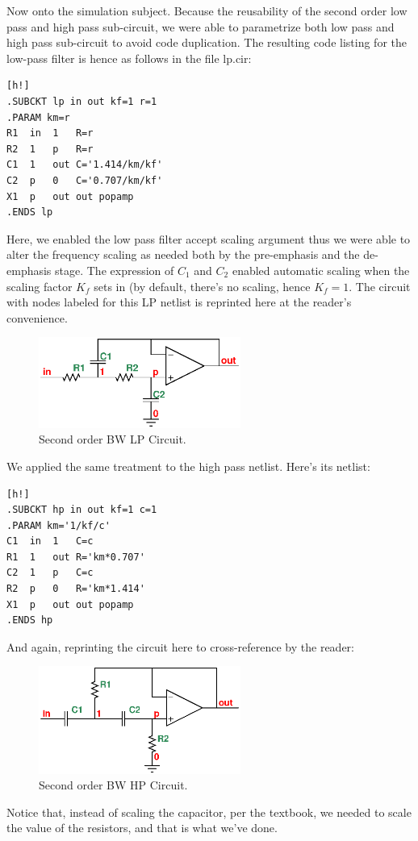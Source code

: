 \documentclass[report]{IEEEtran}
\begin{document}
		Now onto the simulation subject. Because the reusability of the second order low pass and high pass sub-circuit, we were able to parametrize both low pass and high pass sub-circuit to avoid code duplication. The resulting code listing for the low-pass filter is hence as follows in the file lp.cir:
		\begin{center}
		\begin{lstlisting}[caption=2nd order BW LP netlist.][h!]
.SUBCKT lp in out kf=1 r=1
.PARAM km=r
R1	in	1	R=r
R2	1	p	R=r
C1	1	out	C='1.414/km/kf'
C2	p	0	C='0.707/km/kf'
X1	p	out	out	popamp
.ENDS lp
		\end{lstlisting}
		\end{center}
		Here, we enabled the low pass filter accept scaling argument thus we were able to alter the frequency scaling as needed both by the pre-emphasis and the de-emphasis stage. The expression of $C_1$ and $C_2$ enabled automatic scaling when the scaling factor $K_f$ sets in (by default, there's no scaling, hence $K_f=1$. The circuit with nodes labeled for this LP netlist is reprinted here at the reader's convenience.
		\begin{center}
			\begin{figure}[h!]
					\label{lp.cir}
					\includegraphics[width=250px]{lp.eps}
					\caption{Second order BW LP Circuit.}
			\end{figure}
		\end{center}
		We applied the same treatment to the high pass netlist. Here's its netlist:
		\begin{center}
		\begin{lstlisting}[caption=2nd order BW HP netlist.][h!]
.SUBCKT hp in out kf=1 c=1
.PARAM km='1/kf/c'
C1	in	1	C=c
R1	1	out	R='km*0.707'
C2	1	p	C=c
R2	p	0	R='km*1.414'
X1	p	out	out	popamp
.ENDS hp
		\end{lstlisting}
		\end{center}
		And again, reprinting the circuit here to cross-reference by the reader:
		\begin{center}
			\begin{figure}[h!]
					\label{hp.cir}
					\includegraphics[width=250px]{hp.eps}
					\caption{Second order BW HP Circuit.}
			\end{figure}
		\end{center}
		Notice that, instead of scaling the capacitor, per the textbook, we needed to scale the value of the resistors, and that is what we've done.
		
\end{document}
